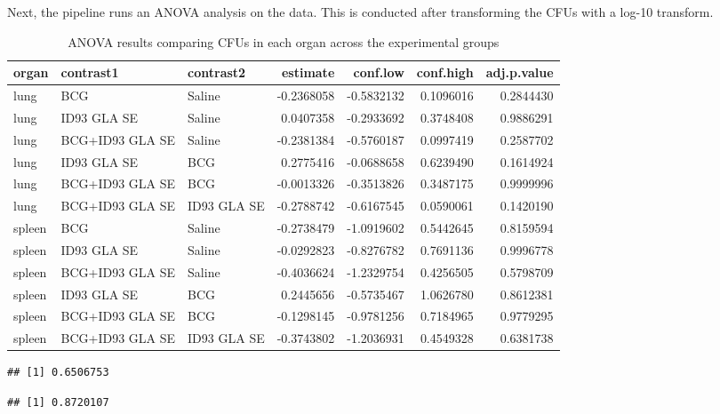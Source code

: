 \documentclass[
]{book}
\begin{document}
Next, the pipeline runs an ANOVA analysis on the data. This is conducted after
transforming the CFUs with a log-10 transform.

\begin{table}

\caption{\label{tab:unnamed-chunk-34}ANOVA results comparing CFUs in each organ across the experimental groups}
\centering
\begin{tabular}[t]{l|l|l|r|r|r|r}
\hline
organ & contrast1 & contrast2 & estimate & conf.low & conf.high & adj.p.value\\
\hline
lung & BCG & Saline & -0.2368058 & -0.5832132 & 0.1096016 & 0.2844430\\
\hline
lung & ID93 GLA SE & Saline & 0.0407358 & -0.2933692 & 0.3748408 & 0.9886291\\
\hline
lung & BCG+ID93 GLA SE & Saline & -0.2381384 & -0.5760187 & 0.0997419 & 0.2587702\\
\hline
lung & ID93 GLA SE & BCG & 0.2775416 & -0.0688658 & 0.6239490 & 0.1614924\\
\hline
lung & BCG+ID93 GLA SE & BCG & -0.0013326 & -0.3513826 & 0.3487175 & 0.9999996\\
\hline
lung & BCG+ID93 GLA SE & ID93 GLA SE & -0.2788742 & -0.6167545 & 0.0590061 & 0.1420190\\
\hline
spleen & BCG & Saline & -0.2738479 & -1.0919602 & 0.5442645 & 0.8159594\\
\hline
spleen & ID93 GLA SE & Saline & -0.0292823 & -0.8276782 & 0.7691136 & 0.9996778\\
\hline
spleen & BCG+ID93 GLA SE & Saline & -0.4036624 & -1.2329754 & 0.4256505 & 0.5798709\\
\hline
spleen & ID93 GLA SE & BCG & 0.2445656 & -0.5735467 & 1.0626780 & 0.8612381\\
\hline
spleen & BCG+ID93 GLA SE & BCG & -0.1298145 & -0.9781256 & 0.7184965 & 0.9779295\\
\hline
spleen & BCG+ID93 GLA SE & ID93 GLA SE & -0.3743802 & -1.2036931 & 0.4549328 & 0.6381738\\
\hline
\end{tabular}
\end{table}

\begin{verbatim}
## [1] 0.6506753
\end{verbatim}

\begin{verbatim}
## [1] 0.8720107
\end{verbatim}
\end{document}
